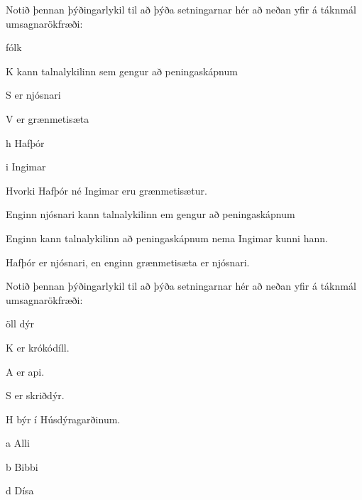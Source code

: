 \problempart
\label{pr.FOLvegetarians}
Notið þennan þýðingarlykil til að þýða setningarnar hér að neðan yfir á táknmál umsagnarökfræði:
\begin{ekey}
\item[\text{yfirgrip}] fólk
\item[K]  kann talnalykilinn sem gengur að peningaskápnum
\item[S]  er njósnari
\item[V]  er grænmetisæta
\item[h] Hafþór
\item[i] Ingimar
\end{ekey}
\begin{earg}
\item Hvorki Hafþór né Ingimar eru grænmetisætur.
\item Enginn njósnari kann talnalykilinn em gengur að peningaskápnum
\item Enginn kann talnalykilinn að peningaskápnum nema Ingimar kunni hann.
\item Hafþór er njósnari, en enginn grænmetisæta er njósnari.
\end{earg}
\problempart\label{pr.FOLalligators}
Notið þennan þýðingarlykil til að þýða setningarnar hér að neðan yfir á táknmál umsagnarökfræði:
\begin{ekey}
\item[\text{yfirgrip}] öll dýr
\item[K]  er krókódíll.
\item[A]  er api.
\item[S]  er skriðdýr.
\item[H]  býr í Húsdýragarðinum.
\item[a] Alli
\item[b] Bibbi
\item[d] Dísa
\end{ekey}
